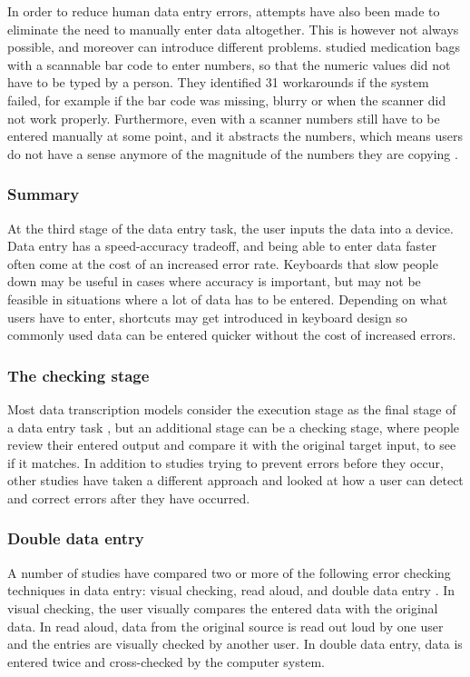 In order to reduce human data entry errors, attempts have also been made to eliminate the need to manually enter data altogether. This is however not always possible, and moreover can introduce different problems.
\citet{Koppel2008} studied medication bags with a scannable bar code to enter numbers, so that the numeric values did not have to be typed by a person. They identified 31 workarounds if the system failed, for example if the bar code was missing, blurry or when the scanner did not work properly. Furthermore, even with a scanner numbers still have to be entered manually at some point, and it abstracts the numbers, which means users do not have a sense anymore of the magnitude of the numbers they are copying \citep{Wiseman2013a}. 

\subsubsection{Summary}
At the third stage of the data entry task, the user inputs the data into a device. Data entry has a speed-accuracy tradeoff, and being able to enter data faster often come at the cost of an increased error rate. 
Keyboards that slow people down may be useful in cases where accuracy is important, but may not be feasible in situations where a lot of data has to be entered. Depending on what users have to enter, shortcuts may get introduced in keyboard design so commonly used data can be entered quicker without the cost of increased errors. 

\subsubsection{The checking stage}
Most data transcription models consider the execution stage as the final stage of a data entry task \citep{Card1983, Salthouse1986}, but an additional stage can be a checking stage, where people review their entered output and compare it with the original target input, to see if it matches. 
In addition to studies trying to prevent errors before they occur, other studies have taken a different approach and looked at how a user can detect and correct errors after they have occurred. 

\subsubsection{Double data entry}
A number of studies have compared two or more of the following error checking techniques in data entry: visual checking, read aloud, and double data entry \citep{Barchard2011, Barchard2013, Kawado2003}. In visual checking, the user visually compares the entered data with the original data. In read aloud, data from the original source is read out loud by one user and the entries are visually checked by another user. In double data entry, data is entered twice and cross-checked by the computer system. 

